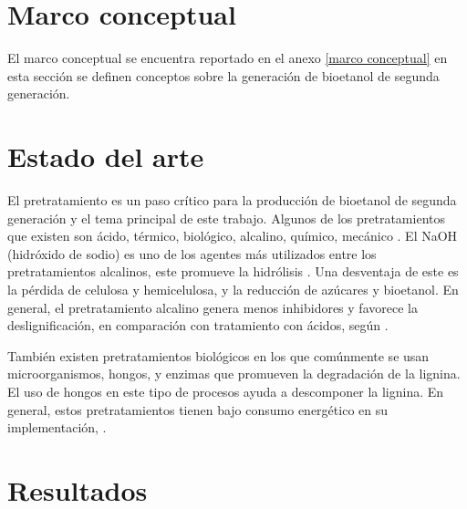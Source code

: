 \documentclass[12pt]{article}
\begin{document}
	\section{Marco conceptual}
	

	
	
	El marco conceptual se encuentra reportado en el anexo	\ref{marco conceptual} en esta sección se definen conceptos sobre la generación de bioetanol de segunda generación.
	
	

	\section{Estado del arte}
	
	El pretratamiento es un paso crítico para la producción de bioetanol de segunda generación y el tema principal de este trabajo. Algunos de los pretratamientos que existen son ácido, térmico, biológico, alcalino, químico, mecánico \cite{ADITIYA2016631}.
	El  NaOH (hidróxido de sodio) es uno de los agentes más utilizados entre los pretratamientos alcalinos, este promueve la hidrólisis \cite{espinosa2021pretratamiento}. Una desventaja de este es la pérdida de celulosa y hemicelulosa, y la reducción de azúcares y bioetanol.
	En general, el pretratamiento alcalino genera menos inhibidores y favorece la deslignificación, en comparación con tratamiento con ácidos, según \cite{valles2022estudio}. 
	
	También existen pretratamientos biológicos en los que comúnmente se usan microorganismos, hongos, y enzimas que promueven la degradación de la lignina. El uso de hongos en este tipo de procesos ayuda a descomponer la lignina. En general, estos pretratamientos tienen bajo consumo energético en su implementación, \cite{Gonzalez2018desarrollo}. 
	
	
	
	\section{Resultados}
	
\end{document}
